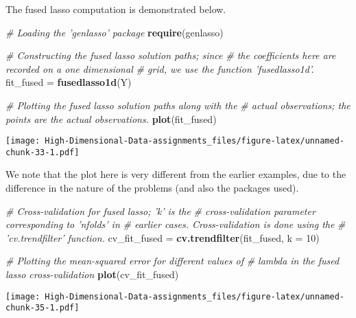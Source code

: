 \documentclass[
]{book}
\newenvironment{Shaded}{\begin{snugshade}}{\end{snugshade}}
\newcommand{\CommentTok}[1]{\textcolor[rgb]{0.56,0.35,0.01}{\textit{#1}}}
\newcommand{\DataTypeTok}[1]{\textcolor[rgb]{0.13,0.29,0.53}{#1}}
\newcommand{\DecValTok}[1]{\textcolor[rgb]{0.00,0.00,0.81}{#1}}
\newcommand{\KeywordTok}[1]{\textcolor[rgb]{0.13,0.29,0.53}{\textbf{#1}}}
\newcommand{\NormalTok}[1]{#1}
\newcommand{\OperatorTok}[1]{\textcolor[rgb]{0.81,0.36,0.00}{\textbf{#1}}}
\newcommand{\StringTok}[1]{\textcolor[rgb]{0.31,0.60,0.02}{#1}}
\begin{document}
The fused lasso computation is demonstrated below.

\begin{Shaded}
\begin{Highlighting}[]
\CommentTok{# Loading the 'genlasso' package}
\KeywordTok{require}\NormalTok{(genlasso)}

\CommentTok{# Constructing the fused lasso solution paths; since}
\CommentTok{# the coefficients here are recorded on a one dimensional}
\CommentTok{# grid, we use the function 'fusedlasso1d'.}
\NormalTok{fit_fused =}\StringTok{ }\KeywordTok{fusedlasso1d}\NormalTok{(Y)}

\CommentTok{# Plotting the fused lasso solution paths along with the}
\CommentTok{# actual observations; the points are the actual observations.}
\KeywordTok{plot}\NormalTok{(fit_fused)}
\end{Highlighting}
\end{Shaded}

\texttt{[image: High-Dimensional-Data-assignments\_files/figure-latex/unnamed-chunk-33-1.pdf]}

We note that the plot here is very different from the earlier examples, due to the difference in the nature of the problems (and also the packages used).

\begin{Shaded}
\begin{Highlighting}[]
\CommentTok{# Cross-validation for fused lasso; 'k' is  the}
\CommentTok{# cross-validation parameter corresponding to 'nfolds' in}
\CommentTok{# earlier cases. Cross-validation is done using the}
\CommentTok{# 'cv.trendfilter' function.}
\NormalTok{cv_fit_fused =}\StringTok{ }\KeywordTok{cv.trendfilter}\NormalTok{(fit_fused, }\DataTypeTok{k =} \DecValTok{10}\NormalTok{)}
\end{Highlighting}
\end{Shaded}

\begin{Shaded}
\begin{Highlighting}[]
\CommentTok{# Plotting the mean-squared error for different values of}
\CommentTok{# lambda in the fused lasso cross-validation}
\KeywordTok{plot}\NormalTok{(cv_fit_fused)}
\end{Highlighting}
\end{Shaded}

\texttt{[image: High-Dimensional-Data-assignments\_files/figure-latex/unnamed-chunk-35-1.pdf]}

\begin{Shaded}
\end{Shaded}
\end{document}
